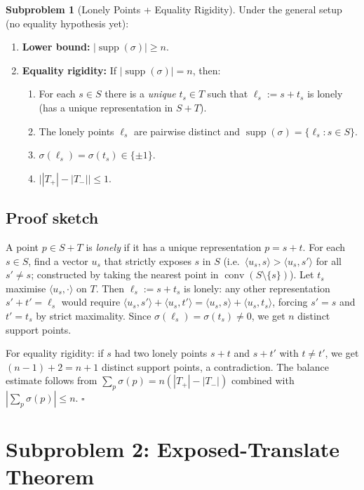\documentclass[12pt,a4paper]{article}
\theoremstyle{definition}
\newtheorem{subproblem}{Subproblem}
\begin{document}
\begin{subproblem}[Lonely Points + Equality Rigidity]\label{sp:1}
Under the general setup (no equality hypothesis yet):
\begin{enumerate}[label=(\alph*)]
\item \textbf{Lower bound:} $|\operatorname{supp}(\sigma)|\ge n$.
\item \textbf{Equality rigidity:} If $|\operatorname{supp}(\sigma)|=n$, then:
  \begin{enumerate}[label=(\roman*)]
  \item For each $s\in S$ there is a \emph{unique} $t_s\in T$ such that
        $\ell_s:=s+t_s$ is lonely (has a unique representation in $S+T$).
  \item The lonely points $\ell_s$ are pairwise distinct and
        $\operatorname{supp}(\sigma)=\{\ell_s:s\in S\}$.
  \item $\sigma(\ell_s)=\sigma(t_s)\in\{\pm1\}$.
  \item $\bigl||T_+|-|T_-|\bigr|\le 1$.
  \end{enumerate}
\end{enumerate}
\end{subproblem}

\subsection*{Proof sketch}

A point $p\in S+T$ is \emph{lonely} if it has a unique representation $p=s+t$.
For each $s\in S$, find a vector $u_s$ that strictly exposes $s$ in $S$
(i.e.\ $\langle u_s,s\rangle > \langle u_s,s'\rangle$ for all $s'\ne s$; constructed by
taking the nearest point in $\operatorname{conv}(S\setminus\{s\})$).
Let $t_s$ maximise $\langle u_s,\cdot\rangle$ on $T$.
Then $\ell_s:=s+t_s$ is lonely: any other representation $s'+t'=\ell_s$
would require $\langle u_s,s'\rangle+\langle u_s,t'\rangle=\langle u_s,s\rangle+\langle u_s,t_s\rangle$,
forcing $s'=s$ and $t'=t_s$ by strict maximality.
Since $\sigma(\ell_s)=\sigma(t_s)\ne 0$, we get $n$ distinct support points.

For equality rigidity: if $s$ had two lonely points $s+t$ and $s+t'$ with $t\ne t'$,
we get $(n-1)+2=n+1$ distinct support points, a contradiction.
The balance estimate follows from $\sum_p\sigma(p)=n(|T_+|-|T_-|)$
combined with $|\sum_p\sigma(p)|\le n$. $\square$

\section{Subproblem 2: Exposed-Translate Theorem}
\end{document}
